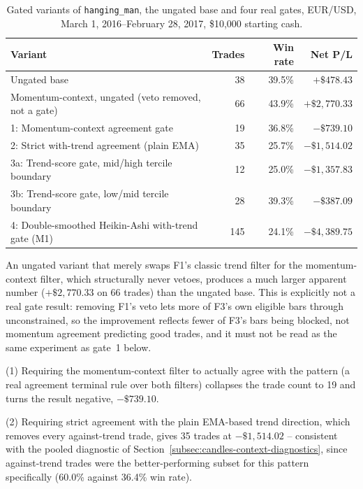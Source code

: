 \begin{table}[htbp]
\centering
\caption[Gated variants of Hanging Man and four real gates]{Gated variants of \texttt{hanging\_man}, the ungated base and four real gates, EUR/USD, March 1, 2016--February 28, 2017, \$10,000 starting cash.}
\label{tab:candles-gated-hanging-man}
\small
\begin{tabular}{p{6.4cm}rrr}
\toprule
\textbf{Variant} & \textbf{Trades} & \textbf{Win rate} & \textbf{Net P/L} \\
\midrule
Ungated base & 38 & 39.5\% & $+\$478.43$ \\
Momentum-context, ungated (veto removed, not a gate) & 66 & 43.9\% & $+\$2{,}770.33$ \\
1: Momentum-context agreement gate & 19 & 36.8\% & $-\$739.10$ \\
2: Strict with-trend agreement (plain EMA) & 35 & 25.7\% & $-\$1{,}514.02$ \\
3a: Trend-score gate, mid/high tercile boundary & 12 & 25.0\% & $-\$1{,}357.83$ \\
3b: Trend-score gate, low/mid tercile boundary & 28 & 39.3\% & $-\$387.09$ \\
4: Double-smoothed Heikin-Ashi with-trend gate (M1) & 145 & 24.1\% & $-\$4{,}389.75$ \\
\bottomrule
\end{tabular}
\end{table}

An ungated variant that merely swaps F1's classic trend filter for the momentum-context filter, which structurally never vetoes, produces a much larger apparent number ($+\$2{,}770.33$ on 66 trades) than the ungated base. This is explicitly not a real gate result: removing F1's veto lets more of F3's own eligible bars through unconstrained, so the improvement reflects fewer of F3's bars being blocked, not momentum agreement predicting good trades, and it must not be read as the same experiment as gate~1 below.

(1) Requiring the momentum-context filter to actually agree with the pattern (a real agreement terminal rule over both filters) collapses the trade count to 19 and turns the result negative, $-\$739.10$.

(2) Requiring strict agreement with the plain EMA-based trend direction, which removes every against-trend trade, gives 35 trades at $-\$1{,}514.02$ -- consistent with the pooled diagnostic of Section~\ref{subsec:candles-context-diagnostics}, since against-trend trades were the better-performing subset for this pattern specifically (60.0\% against 36.4\% win rate).

